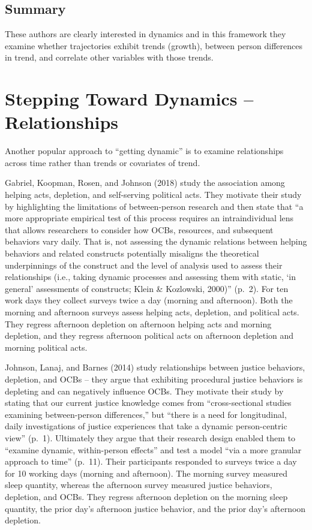 \documentclass[english,,man]{apa6}
\theoremstyle{definition}
\theoremstyle{definition}
\theoremstyle{definition}
\theoremstyle{remark}
\begin{document}
\hypertarget{summary}{%
\subsection{Summary}\label{summary}}

These authors are clearly interested in dynamics and in this framework
they examine whether trajectories exhibit trends (growth), between
person differences in trend, and correlate other variables with those
trends.

\hypertarget{stepping-toward-dynamics-relationships}{%
\section{Stepping Toward Dynamics --
Relationships}\label{stepping-toward-dynamics-relationships}}

Another popular approach to \enquote{getting dynamic} is to examine
relationships across time rather than trends or covariates of trend.

Gabriel, Koopman, Rosen, and Johnson (2018) study the association among
helping acts, depletion, and self-serving political acts. They motivate
their study by highlighting the limitations of between-person research
and then state that \enquote{a more appropriate empirical test of this
process requires an intraindividual lens that allows researchers to
consider how OCBs, resources, and subsequent behaviors vary daily. That
is, not assessing the dynamic relations between helping behaviors and
related constructs potentially misaligns the theoretical underpinnings
of the construct and the level of analysis used to assess their
relationships (i.e., taking dynamic processes and assessing them with
static, \enquote{in general} assessments of constructs; Klein \&
Kozlowski, 2000)} (p.~2). For ten work days they collect surveys twice a
day (morning and afternoon). Both the morning and afternoon surveys
assess helping acts, depletion, and political acts. They regress
afternoon depletion on afternoon helping acts and morning depletion, and
they regress afternoon political acts on afternoon depletion and morning
political acts.

Johnson, Lanaj, and Barnes (2014) study relationships between justice
behaviors, depletion, and OCBs -- they argue that exhibiting procedural
justice behaviors is depleting and can negatively influence OCBs. They
motivate their study by stating that our current justice knowledge comes
from \enquote{cross-sectional studies examining between-person
differences,} but \enquote{there is a need for longitudinal, daily
investigations of justice experiences that take a dynamic person-centric
view} (p.~1). Ultimately they argue that their research design enabled
them to \enquote{examine dynamic, within-person effects} and test a
model \enquote{via a more granular approach to time} (p.~11). Their
participants responded to surveys twice a day for 10 working days
(morning and afternoon). The morning survey measured sleep quantity,
whereas the afternoon survey measured justice behaviors, depletion, and
OCBs. They regress afternoon depletion on the morning sleep quantity,
the prior day's afternoon justice behavior, and the prior day's
afternoon depletion.
\end{document}
